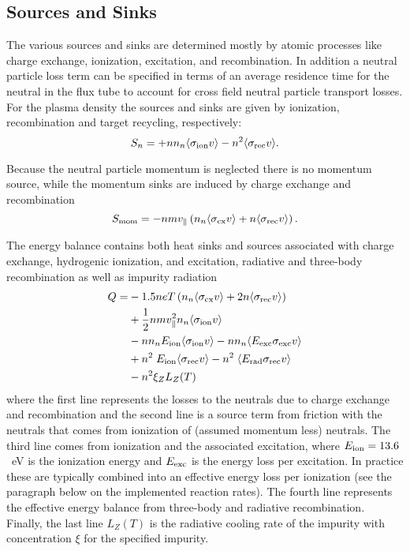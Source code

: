 \documentclass[amsmath,amssymb,a4]{revtex4-2}
\begin{document}
\subsection{Sources and Sinks}

The various sources and sinks are determined mostly by atomic processes like charge exchange, ionization, excitation, and recombination. In addition a neutral particle loss term can be specified in terms of an average residence time for the neutral in the flux tube to account for cross field neutral particle transport losses. For the plasma density the sources and sinks are given by ionization, recombination and target recycling, respectively:
\begin{equation}\label{particle_source}
    S_n = + n n_n \langle\sigma_{\rm ion} v\rangle - n^2 \langle\sigma_{\rm rec} v\rangle.
\end{equation}

Because the neutral particle momentum is neglected there is no momentum source, while the momentum sinks are induced by charge exchange and recombination
\begin{equation}\label{momentum_source}
    S_{\rm mom} = - n m v_\parallel \left(n_n \langle\sigma_{\rm cx} v\rangle + n \langle\sigma_{\rm rec} v\rangle \right).
\end{equation}

The energy balance contains both heat sinks and sources associated with charge exchange, hydrogenic ionization, and excitation, radiative and three-body recombination as well as impurity radiation
\begin{equation}\label{energy_source}
\begin{split}
    Q = &- 1.5 n e T \left(n_n \langle\sigma_{\rm cx} v\rangle + 2 n \langle\sigma_{\rm rec} v\rangle \right) \\
        &+ \frac{1}{2} n m v^2_\parallel n_n \langle\sigma_{\rm ion} v\rangle\\
        &- n n_n E_{\rm ion} \langle \sigma_{\rm ion} v\rangle - n n_n \langle E_{\rm exc} \sigma_{\rm exc} v\rangle \\
        &+ n^2 \;E_{\rm ion} \langle \sigma_{\rm rec} v\rangle - n^2 \;\langle E_{\rm rad} \sigma_{\rm rec} v\rangle \\
        &- n^2 \xi_Z L_Z(T)
\end{split}
\end{equation}
where the first line represents the losses to the neutrals due to charge exchange and recombination and the second line is a source term from friction with the neutrals that comes from ionization of (assumed momentum less) neutrals. The third line comes from ionization and the associated excitation, where $E_{\rm ion} = 13.6$~eV is the ionization energy and $E_{\rm exc}$ is the energy loss per excitation. In practice these are typically combined into an effective energy loss per ionization (see the paragraph below on the implemented reaction rates). The fourth line represents the effective energy balance from three-body and radiative recombination. Finally, the last line $L_Z(T)$ is the radiative cooling rate of the impurity with concentration $\xi$ for the specified impurity.
\end{document}
